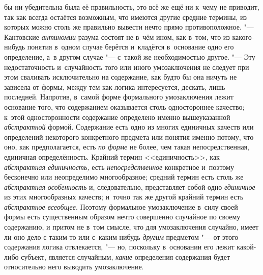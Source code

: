 бы ни убедительна была её правильность, это всё же ещё ни к~чему не
приводит, так как всегда остаётся возможным, что имеются другие средние
термины, из которых можно столь же правильно вывести нечто прямо
противоположное. "--- Кантовские
{\em антиномии} разума
состоят не в~чём ином, как в~том, что из какого-нибудь понятия в~одном
случае берётся и~кладётся в~основание одно его определение, а~в другом
случае "--- с~такой же необходимостью другое. "---
Эту недостаточность и~случайность того или иного
умозаключения не следует при этом сваливать исключительно на содержание,
как будто бы она ничуть не зависела от формы, между тем как логика
интересуется, дескать, лишь последней. Напротив, в~самой форме формального
умозаключения лежит основание того, что содержанием оказывается столь
одностороннее качество; к~этой односторонности содержание определено именно
вышеуказанной {\em абстрактной}
формой. Содержание есть одно из многих единичных качеств или
определений некоторого конкретного предмета или понятия именно потому, что
оно, как предполагается, есть {\em по
форме} не более, чем такая непосредственная, единичная
определённость. Крайний термин <<единичность>>, как
{\em абстрактная единичность,}
есть
{\em непосредственное}
конкретное и~поэтому бесконечно или неопределимо
многообразное; средний термин есть столь же
{\em абстрактная
}{\em особенность} и,
следовательно, представляет собой одно
{\em единичное} из этих
многообразных качеств; и~точно так же другой крайний термин есть
{\em абстрактное всеобщее}.
Поэтому формальное умозаключение в~силу своей формы есть
существенным образом нечто совершенно случайное по своему содержанию, и
притом не в~том смысле, что для умозаключения случайно, имеет ли оно дело с
таким-то или с~каким-нибудь
{\em другим} предметом
"--- от этого содержания логика отвлекается, "---
но, поскольку в~основании его лежит какой-либо субъект,
является случайным, {\em какие}
определения содержания будет относительно него выводить
умозаключение.

